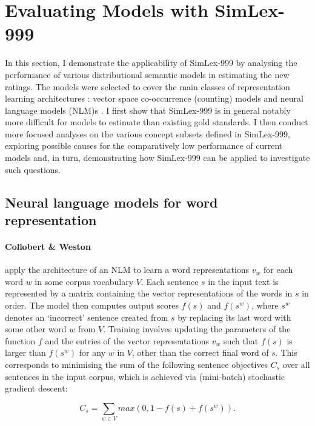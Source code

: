 \section{Evaluating Models with SimLex-999}
\label{evaluation}

In this section, I demonstrate the applicability of SimLex-999 by analysing the performance of various distributional semantic models in estimating the new ratings. The models were selected to cover the main classes of representation learning architectures \cite{baroni2014don}: vector space co-occurrence (counting) models and neural language models (NLM)s \cite{Bengio2003lm}. I first show that SimLex-999 is in general notably more difficult for models to estimate than existing gold standards. I then conduct more focused analyses on the various concept subsets defined in SimLex-999, exploring possible causes for the comparatively low performance of current models and, in turn, demonstrating how SimLex-999 can be applied to investigate such questions.    

\subsection{Neural language models for word representation}
\label{prev}

\paragraph{\bf Collobert \& Weston}

\cite{collobert2008unified} apply the architecture of an NLM to learn a word representations \(v_w\) for each word \(w\) in some corpus vocabulary \( V\). Each sentence \( s\) in the input text is represented by a matrix containing the vector representations of the words in \(s\) in order. The model then computes output scores \(f(s) \) and \(f(s^w) \), where \(s^w\) denotes an `incorrect' sentence created from \(s\) by replacing its last word with some other word \( w\) from \(V\). Training involves updating the parameters of the function \(f\) and the entries of the vector representations \(v_w\) such that  \(f(s)\) is larger than \(f(s^w) \) for any \(w\) in \(V\), other than the correct final word of \(s\). This corresponds to minimising the sum of the following sentence objectives \( C_s\) over all sentences in the input corpus, which is achieved via (mini-batch) stochastic gradient descent:

\[ C_{s}  = \sum_{w \in V} max(0,1-f(s) + f(s^w)). \]

